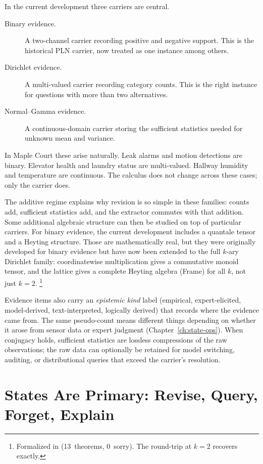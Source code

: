 \documentclass[11pt,openany]{report}
\begin{document}
In the current development three carriers are central.

\begin{description}
\item[Binary evidence.]  A two-channel carrier recording positive and negative
  support.  This is the historical PLN carrier, now treated as one instance
  among others.
\item[Dirichlet evidence.]  A multi-valued carrier recording category counts.
  This is the right instance for questions with more than two alternatives.
\item[Normal--Gamma evidence.]  A continuous-domain carrier storing the
  sufficient statistics needed for unknown mean and variance.
\end{description}

In Maple Court these arise naturally.  Leak alarms and motion detections are
binary.  Elevator health and laundry status are multi-valued.  Hallway
humidity and temperature are continuous.  The calculus does not change across
these cases; only the carrier does.

The additive regime explains why revision is so simple in these families:
counts add, sufficient statistics add, and the extractor commutes with that
addition.  Some additional algebraic structure can then be studied on top of
particular carriers.  For binary evidence, the current development includes a
quantale tensor and a Heyting structure.  Those are mathematically real, but
they were originally developed for binary evidence but have now
been extended to the full $k$-ary Dirichlet family:
coordinatewise multiplication gives a commutative monoid tensor,
and the lattice gives a complete Heyting algebra (Frame) for all
$k$, not just $k = 2$.%
\footnote{Formalized in
(13~theorems, 0~sorry).  The round-trip at $k=2$ recovers
 exactly.}

Evidence items also carry an \emph{epistemic kind} label
(empirical, expert-elicited, model-derived, text-interpreted,
logically derived) that records where the evidence came from.
The same pseudo-count means different things depending on whether
it arose from sensor data or expert judgment
(Chapter~\ref{ch:state-ops}).  When conjugacy holds, sufficient
statistics are lossless compressions of the raw observations; the
raw data can optionally be retained for model switching, auditing,
or distributional queries that exceed the carrier's resolution.


\section{States Are Primary: Revise, Query, Forget, Explain}
\label{sec:overview-four-verbs}
\end{document}
